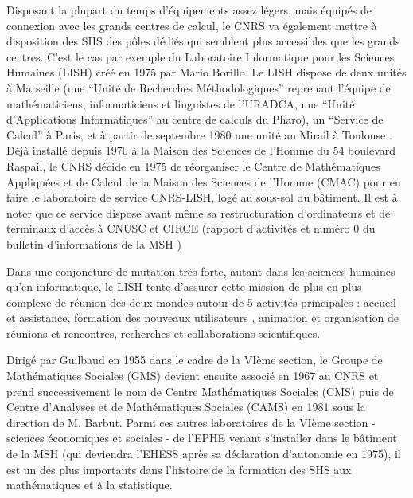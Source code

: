 Disposant la plupart du temps d'équipements assez légers, mais équipés de connexion avec les grands centres de calcul, le CNRS va également mettre à disposition des SHS des pôles dédiés qui semblent plus accessibles que les grands centres. C’est le cas par exemple du Laboratoire Informatique pour les Sciences Humaines (LISH) \autocite{MSH1975} créé en 1975 par Mario Borillo. Le LISH dispose de deux unités à Marseille (une \enquote{Unité de Recherches Méthodologiques} reprenant l'équipe de mathématiciens, informaticiens et linguistes de l'URADCA, une \enquote{Unité d’Applications Informatiques} au centre de calculs du Pharo), un \enquote{Service de Calcul} à Paris, et à partir de septembre 1980 une unité au Mirail à Toulouse \autocites[154]{Mathieu2014}{MSH1975,LISH1981a,LISH1980a,LISH1980b,LISH1981b,LISH1982a,LISH1982b,LISH1984}. Déjà installé depuis 1970 à la Maison des Sciences de l'Homme du 54 boulevard Raspail, le CNRS décide en 1975 de réorganiser le Centre de Mathématiques Appliquées et de Calcul de la Maison des Sciences de l’Homme (CMAC) pour en faire le laboratoire de service CNRS-LISH, logé au sous-sol du bâtiment. Il est à noter que ce service dispose avant même sa restructuration d’ordinateurs et de terminaux d’accès à CNUSC et CIRCE (rapport d’activités \autocite{CNRS1972} et numéro $0$ du bulletin d'informations de la MSH \autocite{MSH1973})

Dans une conjoncture de mutation très forte, autant dans les sciences humaines qu'en informatique, le LISH tente d'assurer cette mission de plus en plus complexe de réunion des deux mondes autour de 5 activités principales : accueil et assistance, formation des nouveaux utilisateurs , animation et organisation de réunions et rencontres, recherches et collaborations scientifiques.


Dirigé par Guilbaud en 1955 dans le cadre de la VIème section, le Groupe de Mathématiques Sociales (GMS) devient ensuite associé en 1967 au CNRS et prend successivement le nom de Centre Mathématiques Sociales (CMS) puis de Centre d’Analyses et de Mathématiques Sociales (CAMS) en 1981 sous la direction de M. Barbut. Parmi ces autres laboratoires de la VIème section - sciences économiques et sociales - de l'EPHE venant s'installer dans le bâtiment de la MSH (qui deviendra l'EHESS après sa déclaration d'autonomie en 1975), il est un des plus importants dans l'histoire de la formation des SHS aux mathématiques et à la statistique.


